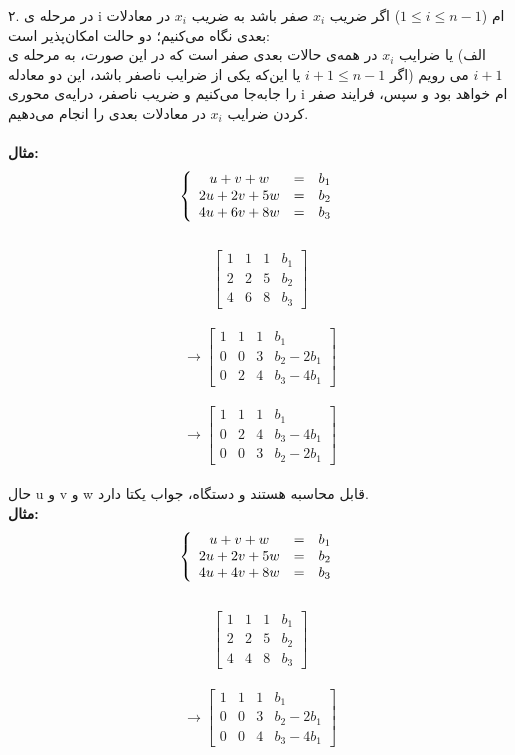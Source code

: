 ۲. در مرحله ی i ام ($1 \le i \le n-1$) اگر ضریب $x_{i}$  صفر باشد به ضریب $x_{i}$ در معادلات بعدی نگاه می‌کنیم؛ دو حالت امکان‌پذیر است:\\
الف) یا ضرایب $x_{i}$ در همه‌ی حالات بعدی صفر است که در این صورت، به مرحله ی $i+1$ می رویم (اگر $i+1 \le n-1$ یا این‌که یکی از ضرایب ناصفر باشد، این دو معادله را جا‌به‌جا می‌کنیم و ضریب ناصفر، درایه‌ی محوری i ام خواهد بود و سپس، فرایند صفر کردن ضرایب $x_{i}$ در معادلات بعدی را انجام می‌دهیم.\\\\
\textbf{مثال:}\\
\[
\left\{
\begin{array}{cccc@{\qquad}l}
u  +  v +  w &=&  b_{1} \\
2u + 2v + 5w &=& b_{2}\\
4u + 6v + 8w &=& b_{3}
\end{array}
\right.
\]\\
$$\begin{bmatrix}1&1&1&b_{1}\\2&2&5&b_{2}\\4&6&8&b_{3}\end{bmatrix}$$ \\
$$\longrightarrow\begin{bmatrix}1&1&1&b_{1}\\0&0&3&b_{2}-2b_{1}\\0&2&4&b_{3}-4b_{1}\end{bmatrix}$$ \\
$$\longrightarrow\begin{bmatrix}1&1&1&b_{1}\\0&2&4&b_{3}-4b_{1}\\0&0&3&b_{2}-2b_{1}\end{bmatrix}$$ \\
حال u و v و w قابل محاسبه هستند و دستگاه، جواب یکتا دارد.\\
\textbf{مثال:}
\[
\left\{
\begin{array}{cccc@{\qquad}l}
u  +  v +  w &=&  b_{1} \\
2u + 2v + 5w &=& b_{2}\\
4u + 4v + 8w &=& b_{3}
\end{array}
\right.
\]\\
$$\begin{bmatrix}1&1&1&b_{1}\\2&2&5&b_{2}\\4&4&8&b_{3}\end{bmatrix}$$ \\
$$\longrightarrow\begin{bmatrix}1&1&1&b_{1}\\0&0&3&b_{2}-2b_{1}\\0&0&4&b_{3}-4b_{1}\end{bmatrix}$$ \\
